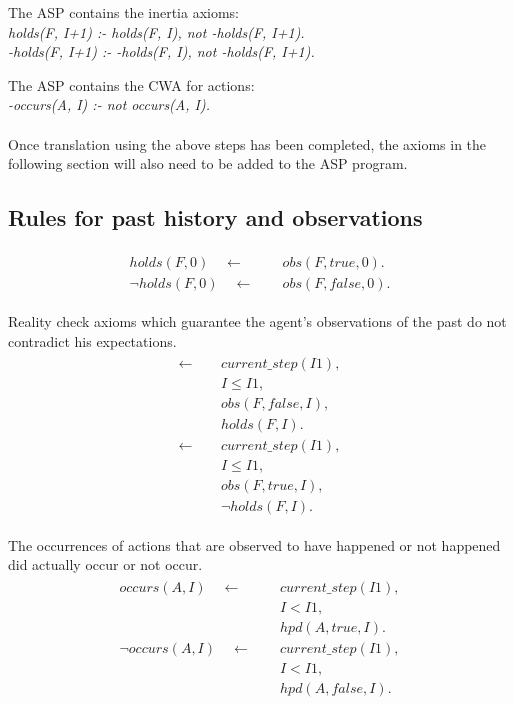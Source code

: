 \documentclass[11pt, oneside]{article}
\begin{document}
The ASP contains the inertia axioms:\\
\textit{holds(F, I+1) :- holds(F, I), not -holds(F, I+1).}\\
\textit{-holds(F, I+1) :- -holds(F, I), not -holds(F, I+1).}\par

The ASP contains the CWA for actions:\\
\textit{-occurs(A, I) :- not occurs(A, I).}\\
\\
Once translation using the above steps has been completed, the axioms in the following section will also need to be added to the ASP program.



\subsection{Rules for past history and observations}

\begin{align}\begin{split}
holds(F, 0)  \quad \leftarrow \quad\ &obs(F,true,0).\\
\neg holds(F, 0)  \quad \leftarrow \quad\ &obs(F,false,0).
\end{split}\end{align}


Reality check axioms which guarantee the agent's observations of the past do not contradict his expectations.
\begin{align}\begin{split}
\leftarrow \quad\ &current\_step(I1),\\
&I \leq I1,\\
&obs(F, false, I),\\
&holds(F, I).\\
\leftarrow \quad\ &current\_step(I1),\\
&I \leq I1,\\
&obs(F, true, I),\\
&\neg holds(F, I).
\end{split}\end{align}

The occurrences of actions that are observed to have happened or not happened did actually occur or not occur.
\begin{align}\begin{split}
occurs(A, I)  \quad \leftarrow \quad\ &current\_step(I1),\\
&I < I1,\\
&hpd(A, true, I).\\
\neg occurs(A, I) \quad \leftarrow \quad\ &current\_step(I1),\\
&I < I1,\\
&hpd(A, false, I).
\end{split}\end{align}
\end{document}
